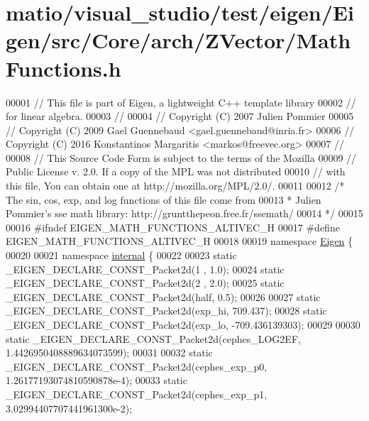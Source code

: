 \hypertarget{matio_2visual__studio_2test_2eigen_2_eigen_2src_2_core_2arch_2_z_vector_2_math_functions_8h_source}{}\section{matio/visual\+\_\+studio/test/eigen/\+Eigen/src/\+Core/arch/\+Z\+Vector/\+Math\+Functions.h}
\label{matio_2visual__studio_2test_2eigen_2_eigen_2src_2_core_2arch_2_z_vector_2_math_functions_8h_source}

\begin{DoxyCode}
00001 \textcolor{comment}{// This file is part of Eigen, a lightweight C++ template library}
00002 \textcolor{comment}{// for linear algebra.}
00003 \textcolor{comment}{//}
00004 \textcolor{comment}{// Copyright (C) 2007 Julien Pommier}
00005 \textcolor{comment}{// Copyright (C) 2009 Gael Guennebaud <gael.guennebaud@inria.fr>}
00006 \textcolor{comment}{// Copyright (C) 2016 Konstantinos Margaritis <markos@freevec.org>}
00007 \textcolor{comment}{//}
00008 \textcolor{comment}{// This Source Code Form is subject to the terms of the Mozilla}
00009 \textcolor{comment}{// Public License v. 2.0. If a copy of the MPL was not distributed}
00010 \textcolor{comment}{// with this file, You can obtain one at http://mozilla.org/MPL/2.0/.}
00011 
00012 \textcolor{comment}{/* The sin, cos, exp, and log functions of this file come from}
00013 \textcolor{comment}{ * Julien Pommier's sse math library: http://gruntthepeon.free.fr/ssemath/}
00014 \textcolor{comment}{ */}
00015 
00016 \textcolor{preprocessor}{#ifndef EIGEN\_MATH\_FUNCTIONS\_ALTIVEC\_H}
00017 \textcolor{preprocessor}{#define EIGEN\_MATH\_FUNCTIONS\_ALTIVEC\_H}
00018 
00019 \textcolor{keyword}{namespace }\hyperlink{namespace_eigen}{Eigen} \{
00020 
00021 \textcolor{keyword}{namespace }\hyperlink{namespaceinternal}{internal} \{
00022 
00023 \textcolor{keyword}{static} \_EIGEN\_DECLARE\_CONST\_Packet2d(1 , 1.0);
00024 \textcolor{keyword}{static} \_EIGEN\_DECLARE\_CONST\_Packet2d(2 , 2.0);
00025 \textcolor{keyword}{static} \_EIGEN\_DECLARE\_CONST\_Packet2d(half, 0.5);
00026 
00027 \textcolor{keyword}{static} \_EIGEN\_DECLARE\_CONST\_Packet2d(exp\_hi,  709.437);
00028 \textcolor{keyword}{static} \_EIGEN\_DECLARE\_CONST\_Packet2d(exp\_lo, -709.436139303);
00029 
00030 \textcolor{keyword}{static} \_EIGEN\_DECLARE\_CONST\_Packet2d(cephes\_LOG2EF, 1.4426950408889634073599);
00031 
00032 \textcolor{keyword}{static} \_EIGEN\_DECLARE\_CONST\_Packet2d(cephes\_exp\_p0, 1.26177193074810590878e-4);
00033 \textcolor{keyword}{static} \_EIGEN\_DECLARE\_CONST\_Packet2d(cephes\_exp\_p1, 3.02994407707441961300e-2);

\end{DoxyCode}
